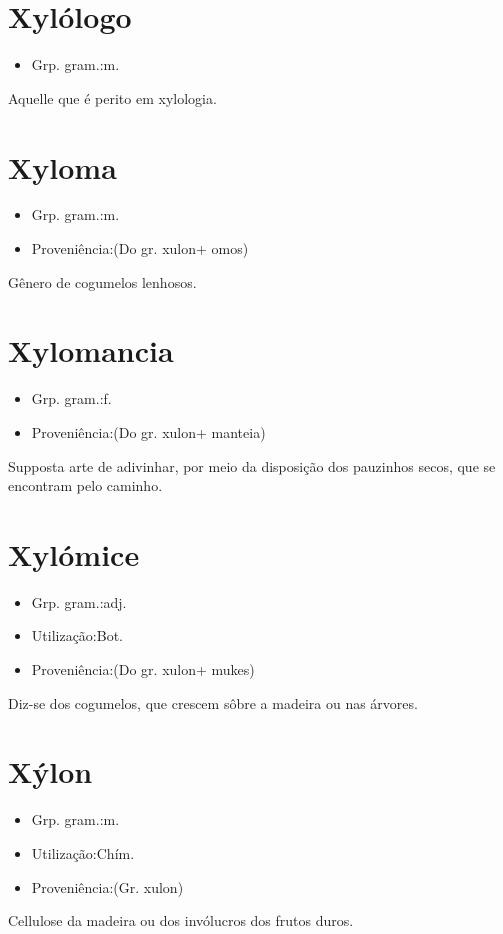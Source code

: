 \section{Xylólogo}
\begin{itemize}
\item {Grp. gram.:m.}
\end{itemize}
Aquelle que é perito em xylologia.
\section{Xyloma}
\begin{itemize}
\item {Grp. gram.:m.}
\end{itemize}
\begin{itemize}
\item {Proveniência:(Do gr. \textunderscore xulon\textunderscore  + \textunderscore omos\textunderscore )}
\end{itemize}
Gênero de cogumelos lenhosos.
\section{Xylomancia}
\begin{itemize}
\item {Grp. gram.:f.}
\end{itemize}
\begin{itemize}
\item {Proveniência:(Do gr. \textunderscore xulon\textunderscore  + \textunderscore manteia\textunderscore )}
\end{itemize}
Supposta arte de adivinhar, por meio da disposição dos pauzinhos secos, que se encontram pelo caminho.
\section{Xylómice}
\begin{itemize}
\item {Grp. gram.:adj.}
\end{itemize}
\begin{itemize}
\item {Utilização:Bot.}
\end{itemize}
\begin{itemize}
\item {Proveniência:(Do gr. \textunderscore xulon\textunderscore  + \textunderscore mukes\textunderscore )}
\end{itemize}
Diz-se dos cogumelos, que crescem sôbre a madeira ou nas árvores.
\section{Xýlon}
\begin{itemize}
\item {Grp. gram.:m.}
\end{itemize}
\begin{itemize}
\item {Utilização:Chím.}
\end{itemize}
\begin{itemize}
\item {Proveniência:(Gr. \textunderscore xulon\textunderscore )}
\end{itemize}
Cellulose da madeira ou dos invólucros dos frutos duros.
